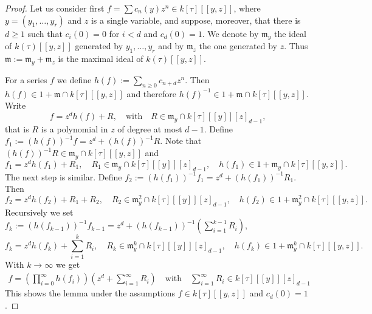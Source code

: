 \documentclass[10pt,a4paper]{amsart}
\newcommand{\h}{{h}}
\newcommand{\kk}{{k}}
\newcommand{\my}{\mathfrak m}
\begin{document}
\begin{proof}
Let us consider first  $f = \sum c_n(y) z^n\in \kk[\tau] [[y,z]]$, where $y=(y_1, \ldots , y_r)$ and $z$ is a single variable, and suppose, moreover, that there is $d\ge 1$  such that $c_i(0)=0$ for $i<d $ and $c_d(0)=1 $.
We denote by $\my_y$ the ideal of $\kk (\tau) [[y,z]]$ generated by $y_1, \ldots, y_r$ and by $\my_z$ the one generated by 
$z$.  Thus $\my := \my_y + \my_z$ is the maximal ideal of $\kk (\tau) [[y,z]]$.  
 
For a series $f$ we define $\h (f):= \sum_{n\geq 0} c_{n+d} z^n$.  
Then  $\h (f)\in 1+ \my \cap \kk [\tau ] [[y,z]]$ and therefore $\h (f)^{-1}\in 1+ \my \cap \kk [\tau ] [[y,z]]$.   Write 
$$
f= z^d \h (f) + R,  \quad \text {with} \quad R\in \my_y \cap \kk[\tau] [[y]][z]_{d-1},  
$$
that is $R$ is a polynomial in $z$ of degree at most $d-1$.  
  Define 
$f_1:= (\h (f))^{-1} f = z^d +   (\h (f))^{-1} R  $. Note that 
$(\h (f))^{-1} R \in  \my_y \cap \kk [\tau ] [[y,z]]$  and 
$$
f_1= z^d \h (f_1) + R_1,  \quad R_1\in  \my_y \cap \kk[\tau] [[y]][z]_{d-1}, \quad \h (f_1)
\in 1+ \my_y \cap \kk [\tau ] [[y,z]] .$$
The next step is similar. Define 
$f_2:= (\h (f_1))^{-1} f_1 = z^d +  (\h (f_1))^{-1} R_1 $.  Then 
$$
f_2= z^d \h (f_2) + R_1 + R_2 ,  \quad R_2\in \my_y^2 \cap \kk[\tau] [[y]][z]_{d-1}, \quad \h (f_2) \in 1+ 
\my_y^2 \cap \kk [\tau ] [[y,z]] .
$$
Recursively we set $f_{k}:= (\h (f_{k-1}))^{-1} f_{k-1} = z^d + (\h (f_{k-1}) )^{-1} (\sum_{i=1}^{k-1} R_i) ,$ 
$$
f_{k} = z^d \h (f_{k}) + \sum_{i=1}^{k} R_i, \quad 
R_{k}\in  \my_y^{k} \cap \kk[\tau] [[y]][z]_{d-1}, \quad \h (f_{k})\in 1+ 
\my_y^{k} \cap \kk [\tau ] [[y,z]] .
$$
  With $k\to \infty$ we get 
\begin{align*}
f = (\prod_{i=0}^{\infty} \h (f_i)) (z^d  + \sum_{i=1}^{\infty} R_i)  \quad \text {with} \quad \sum_{i=1}^{\infty} R_i \in 
\kk[\tau] [[y]][z]_{d-1}
\end{align*}
This shows the lemma under the assumptions $f \in \kk[\tau] [[y,z]]$ and $c_d(0) =1$.  



\end{proof}
\end{document}
